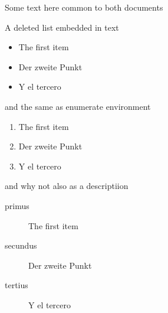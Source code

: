 \documentclass{article}
\begin{document}
Some text here common to both documents

A deleted list embedded in text
\begin{itemize}
 \item The first item
 \item Der zweite Punkt
 \item Y el tercero
\end{itemize}
and the same as enumerate environment
\begin{enumerate}
 \item The first item
 \item Der zweite Punkt
 \item Y el tercero
\end{enumerate}
and why not also as a descriptiion
\begin{description}
 \item[primus] The first item
 \item[secundus] Der zweite Punkt
 \item[tertius] Y el tercero
\end{description}
\end{document}

